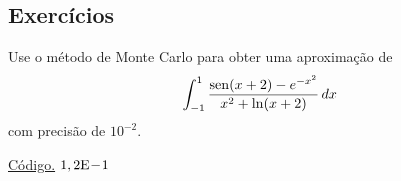 \subsection*{Exercícios}

\begin{exer}\label{exer:Monte_Carlo_fun1}
  Use o método de Monte Carlo para obter uma aproximação de 
  \begin{equation}
    \int_{-1}^1 \frac{\operatorname{sen}(x+2)-e^{-x^2}}{x^2+\ln(x+2)}\,dx
  \end{equation}
com precisão de $10^{-2}$.
\end{exer}
\begin{resp}
  \ifisoctave 
  \href{https://github.com/phkonzen/notas/blob/master/src/MatematicaNumerica/cap_integr/dados/exer_Monte_Carlo_fun1/exer_Monte_Carlo_fun1.m}{Código.} 
  \fi
  $1,2\mathrm{E}\!-\!1$
\end{resp}
